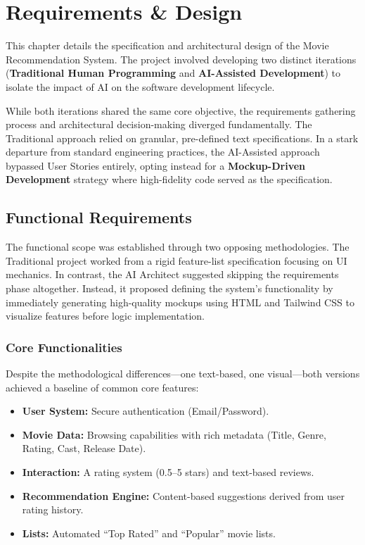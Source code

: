 \documentclass[a4paper,12pt]{report}
\begin{document}
\chapter{Requirements \& Design}

This chapter details the specification and architectural design of the Movie Recommendation System. The project involved developing two distinct iterations (\textbf{Traditional Human Programming} and \textbf{AI-Assisted Development}) to isolate the impact of AI on the software development lifecycle.

While both iterations shared the same core objective, the requirements gathering process and architectural decision-making diverged fundamentally. The Traditional approach relied on granular, pre-defined text specifications. In a stark departure from standard engineering practices, the AI-Assisted approach bypassed User Stories entirely, opting instead for a \textbf{Mockup-Driven Development} strategy where high-fidelity code served as the specification.

\section{Functional Requirements}

The functional scope was established through two opposing methodologies. The Traditional project worked from a rigid feature-list specification focusing on UI mechanics. In contrast, the AI Architect suggested skipping the requirements phase altogether. Instead, it proposed defining the system's functionality by immediately generating high-quality mockups using HTML and Tailwind CSS to visualize features before logic implementation.

\subsection{Core Functionalities}

Despite the methodological differences—one text-based, one visual—both versions achieved a baseline of common core features:

\begin{itemize}
    \item \textbf{User System:} Secure authentication (Email/Password).
    \item \textbf{Movie Data:} Browsing capabilities with rich metadata (Title, Genre, Rating, Cast, Release Date).
    \item \textbf{Interaction:} A rating system (0.5--5 stars) and text-based reviews.
    \item \textbf{Recommendation Engine:} Content-based suggestions derived from user rating history.
    \item \textbf{Lists:} Automated ``Top Rated'' and ``Popular'' movie lists.
\end{itemize}
\end{document}

